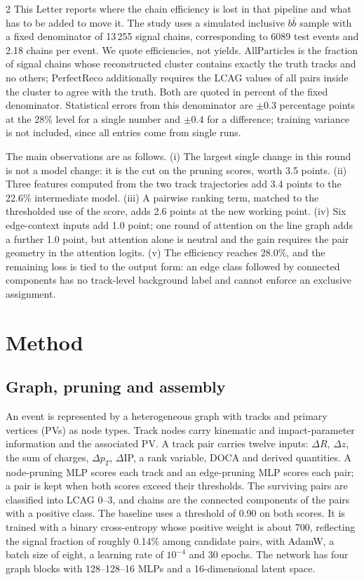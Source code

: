 \documentclass[10pt]{article}
\newcommand{\All}{\ensuremath{\mathrm{AllParticles}}}
\newcommand{\Perf}{\ensuremath{\mathrm{PerfectReco}}}
\begin{document}
\begin{multicols}{2}
This Letter reports where the chain efficiency is lost in that pipeline and what has to be added to move it. The study uses a simulated inclusive $b\bar b$ sample with a fixed denominator of 13\,255 signal chains, corresponding to 6089 test events and 2.18 chains per event. We quote efficiencies, not yields. \All{} is the fraction of signal chains whose reconstructed cluster contains exactly the truth tracks and no others; \Perf{} additionally requires the LCAG values of all pairs inside the cluster to agree with the truth. Both are quoted in percent of the fixed denominator. Statistical errors from this denominator are $\pm0.3$ percentage points at the 28\% level for a single number and $\pm0.4$ for a difference; training variance is not included, since all entries come from single runs.

The main observations are as follows. (i) The largest single change in this round is not a model change: it is the cut on the pruning scores, worth 3.5 points. (ii) Three features computed from the two track trajectories add 3.4 points to the 22.6\% intermediate model. (iii) A pairwise ranking term, matched to the thresholded use of the score, adds 2.6 points at the new working point. (iv) Six edge-context inputs add 1.0 point; one round of attention on the line graph adds a further 1.0 point, but attention alone is neutral and the gain requires the pair geometry in the attention logits. (v) The efficiency reaches 28.0\%, and the remaining loss is tied to the output form: an edge class followed by connected components has no track-level background label and cannot enforce an exclusive assignment.

\section{Method}

\subsection{Graph, pruning and assembly}

An event is represented by a heterogeneous graph with tracks and primary vertices (PVs) as node types. Track nodes carry kinematic and impact-parameter information and the associated PV. A track pair carries twelve inputs: $\Delta R$, $\Delta z$, the sum of charges, $\Delta p_T$, $\Delta$IP, a rank variable, DOCA and derived quantities. A node-pruning MLP scores each track and an edge-pruning MLP scores each pair; a pair is kept when both scores exceed their thresholds. The surviving pairs are classified into LCAG 0--3, and chains are the connected components of the pairs with a positive class. The baseline uses a threshold of 0.90 on both scores. It is trained with a binary cross-entropy whose positive weight is about 700, reflecting the signal fraction of roughly 0.14\% among candidate pairs, with AdamW, a batch size of eight, a learning rate of $10^{-4}$ and 30 epochs. The network has four graph blocks with 128--128--16 MLPs and a 16-dimensional latent space.


\end{multicols}
\end{document}
